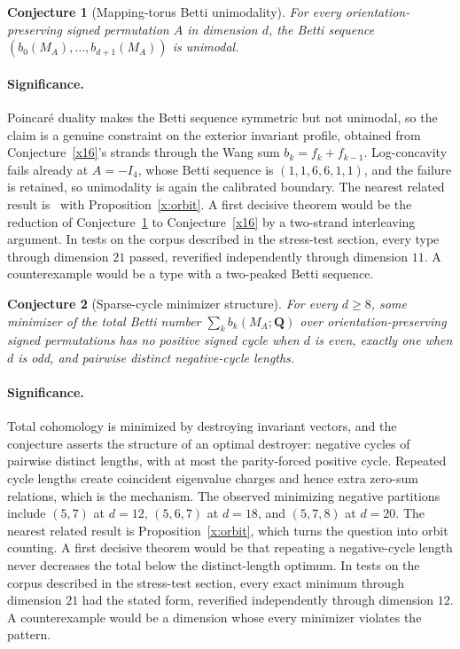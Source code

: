 \documentclass[11pt]{article}
\newtheorem{conjecture}{Conjecture}
\theoremstyle{definition}
\begin{document}
\begin{conjecture}[Mapping-torus Betti unimodality]\label{x17}
For every orientation-preserving signed permutation $A$ in dimension $d$, the Betti sequence $(b_0(M_A),\ldots,b_{d+1}(M_A))$ is unimodal.
\end{conjecture}

\paragraph{Significance.}
Poincar\'e duality makes the Betti sequence symmetric but not unimodal, so the claim is a genuine constraint on the exterior invariant profile, obtained from Conjecture~\ref{x16}'s strands through the Wang sum $b_k=f_k+f_{k-1}$.  Log-concavity fails already at $A=-I_4$, whose Betti sequence is $(1,1,6,6,1,1)$, and the failure is retained, so unimodality is again the calibrated boundary.  The nearest related result is~\cite{Mil68} with Proposition~\ref{x:orbit}.  A first decisive theorem would be the reduction of Conjecture~\ref{x17} to Conjecture~\ref{x16} by a two-strand interleaving argument.  In tests on the corpus described in the stress-test section, every type through dimension $21$ passed, reverified independently through dimension $11$.  A counterexample would be a type with a two-peaked Betti sequence.

\begin{conjecture}[Sparse-cycle minimizer structure]\label{x18}
For every $d\ge8$, some minimizer of the total Betti number $\sum_kb_k(M_A;\mathbf Q)$ over orientation-preserving signed permutations has no positive signed cycle when $d$ is even, exactly one when $d$ is odd, and pairwise distinct negative-cycle lengths.
\end{conjecture}

\paragraph{Significance.}
Total cohomology is minimized by destroying invariant vectors, and the conjecture asserts the structure of an optimal destroyer: negative cycles of pairwise distinct lengths, with at most the parity-forced positive cycle.  Repeated cycle lengths create coincident eigenvalue charges and hence extra zero-sum relations, which is the mechanism.  The observed minimizing negative partitions include $(5,7)$ at $d=12$, $(5,6,7)$ at $d=18$, and $(5,7,8)$ at $d=20$.  The nearest related result is Proposition~\ref{x:orbit}, which turns the question into orbit counting.  A first decisive theorem would be that repeating a negative-cycle length never decreases the total below the distinct-length optimum.  In tests on the corpus described in the stress-test section, every exact minimum through dimension $21$ had the stated form, reverified independently through dimension $12$.  A counterexample would be a dimension whose every minimizer violates the pattern.
\end{document}
